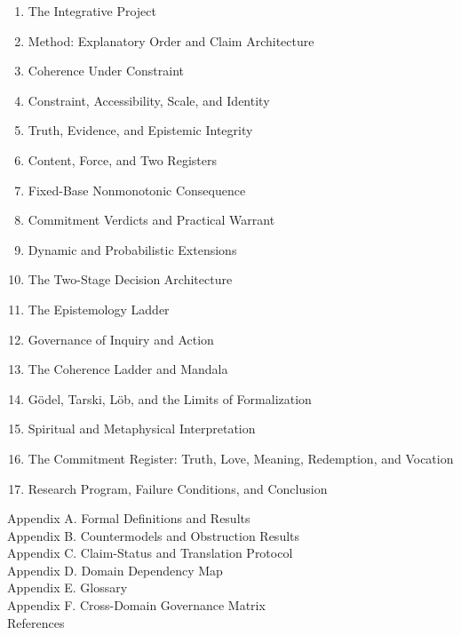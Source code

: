 \documentclass[
  11pt,
]{article}
\providecommand{\tightlist}{%
  \setlength{\itemsep}{0pt}\setlength{\parskip}{0pt}}
\begin{document}
\begin{enumerate}
\def\labelenumi{\arabic{enumi}.}
\tightlist
\item
  The Integrative Project\\
\item
  Method: Explanatory Order and Claim Architecture\\
\item
  Coherence Under Constraint\\
\item
  Constraint, Accessibility, Scale, and Identity\\
\item
  Truth, Evidence, and Epistemic Integrity\\
\item
  Content, Force, and Two Registers\\
\item
  Fixed-Base Nonmonotonic Consequence\\
\item
  Commitment Verdicts and Practical Warrant\\
\item
  Dynamic and Probabilistic Extensions\\
\item
  The Two-Stage Decision Architecture\\
\item
  The Epistemology Ladder\\
\item
  Governance of Inquiry and Action\\
\item
  The Coherence Ladder and Mandala\\
\item
  Gödel, Tarski, Löb, and the Limits of Formalization\\
\item
  Spiritual and Metaphysical Interpretation\\
\item
  The Commitment Register: Truth, Love, Meaning, Redemption, and
  Vocation\\
\item
  Research Program, Failure Conditions, and Conclusion
\end{enumerate}

Appendix A. Formal Definitions and Results\\
Appendix B. Countermodels and Obstruction Results\\
Appendix C. Claim-Status and Translation Protocol\\
Appendix D. Domain Dependency Map\\
Appendix E. Glossary\\
Appendix F. Cross-Domain Governance Matrix\\
References
\end{document}
